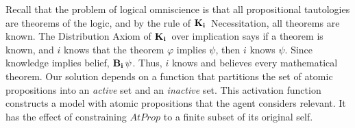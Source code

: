 

Recall that the problem of logical omniscience is that all propositional tautologies are theorems of the logic, and by the rule of $\mathbf{K}_{\mathbf{i}}\,$ Necessitation, all theorems are known. The Distribution Axiom of $\mathbf{K}_{\mathbf{i}}\,$ over implication says if a theorem is known, and $i$ knows that the theorem $\varphi$ implies $\psi$, then $i$ knows $\psi$. Since knowledge implies belief, $\mathbf{B}_{\mathbf{i}}\,\psi$. Thus, $i$ knows and believes every mathematical theorem. Our solution depends on a function that partitions the set of atomic propositions into an \emph{active} set and an \emph{inactive} set. This activation function constructs a model with atomic propositions that the agent considers relevant. It has the effect of constraining $AtProp$ to a finite subset of its original self. 


